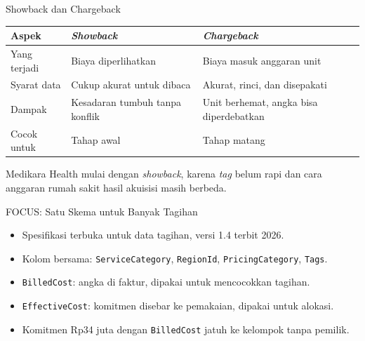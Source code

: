 \documentclass[aspectratio=169, table, 12pt]{beamer}
\begin{document}
\begin{frame}{{\Large Showback dan Chargeback}}
  \footnotesize
  \begin{tabularx}{\textwidth}{>{\raggedright\arraybackslash}p{2.8cm}
      >{\raggedright\arraybackslash}X >{\raggedright\arraybackslash}X}
    \hline
    \textbf{Aspek} & \textbf{\textit{Showback}} & \textbf{\textit{Chargeback}} \\
    \hline
    Yang terjadi & Biaya diperlihatkan & Biaya masuk anggaran unit \\
    \hline
    Syarat data & Cukup akurat untuk dibaca & Akurat, rinci, dan disepakati \\
    \hline
    Dampak & Kesadaran tumbuh tanpa konflik & Unit berhemat, angka bisa
      diperdebatkan \\
    \hline
    Cocok untuk & Tahap awal & Tahap matang \\
    \hline
  \end{tabularx}

  \vspace{10pt}
  \small
  Medikara Health mulai dengan \textit{showback}, karena \textit{tag} belum rapi
  dan cara anggaran rumah sakit hasil akuisisi masih berbeda.
\end{frame}

\begin{frame}{{\Large FOCUS: Satu Skema untuk Banyak Tagihan}}
  \vspace{10pt}
  \begin{itemize}
    \item Spesifikasi terbuka untuk data tagihan, versi 1.4 terbit 2026.
    \item Kolom bersama: \texttt{ServiceCategory}, \texttt{RegionId},
          \texttt{PricingCategory}, \texttt{Tags}.
    \item \texttt{BilledCost}: angka di faktur, dipakai untuk mencocokkan
          tagihan.
    \item \texttt{EffectiveCost}: komitmen disebar ke pemakaian, dipakai untuk
          alokasi.
    \item Komitmen Rp34 juta dengan \texttt{BilledCost} jatuh ke kelompok tanpa
          pemilik.
  \end{itemize}
\end{frame}
\end{document}

